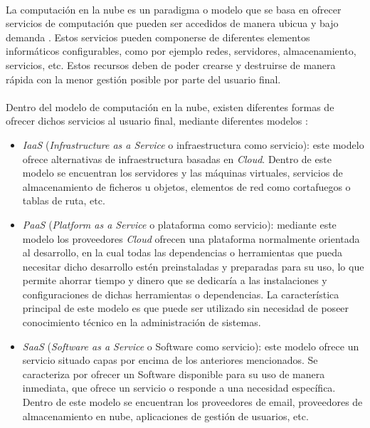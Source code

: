 \documentclass[../../memoria.tex]{subfiles}
\begin{document}
\paragraph{}
La computación en la nube es un paradigma o modelo que se basa en ofrecer servicios de computación que pueden ser accedidos de manera ubicua y bajo demanda \cite{nist}. Estos servicios pueden componerse de diferentes elementos informáticos configurables, como por ejemplo redes, servidores, almacenamiento, servicios, etc. Estos recursos deben de poder crearse y destruirse de manera rápida con la menor gestión posible por parte del usuario final.

\paragraph{}
Dentro del modelo de computación en la nube, existen diferentes formas de ofrecer dichos servicios al usuario final, mediante diferentes modelos \cite{xaas}:

\begin{itemize}
    \item \textit{IaaS} (\textit{Infrastructure as a Service} o infraestructura como servicio): este modelo ofrece alternativas de infraestructura basadas en \textit{Cloud}. Dentro de este modelo se encuentran los servidores y las máquinas virtuales, servicios de almacenamiento de ficheros u objetos, elementos de red como cortafuegos o tablas de ruta, etc.

    \item \textit{PaaS} (\textit{Platform as a Service} o plataforma como servicio): mediante este modelo los proveedores \textit{Cloud} ofrecen una plataforma normalmente orientada al desarrollo, en la cual todas las dependencias o herramientas que pueda necesitar dicho desarrollo estén preinstaladas y preparadas para su uso, lo que permite ahorrar tiempo y dinero que se dedicaría a las instalaciones y configuraciones de dichas herramientas o dependencias. La característica principal de este modelo es que puede ser utilizado sin necesidad de poseer conocimiento técnico en la administración de sistemas.

    \item \textit{SaaS} (\textit{Software as a Service} o Software como servicio): este modelo ofrece un servicio situado capas por encima de los anteriores mencionados. Se caracteriza por ofrecer un Software disponible para su uso de manera inmediata, que ofrece un servicio o responde a una necesidad específica. Dentro de este modelo se encuentran los proveedores de email, proveedores de almacenamiento en nube, aplicaciones de gestión de usuarios, etc.
\end{itemize}
\end{document}
